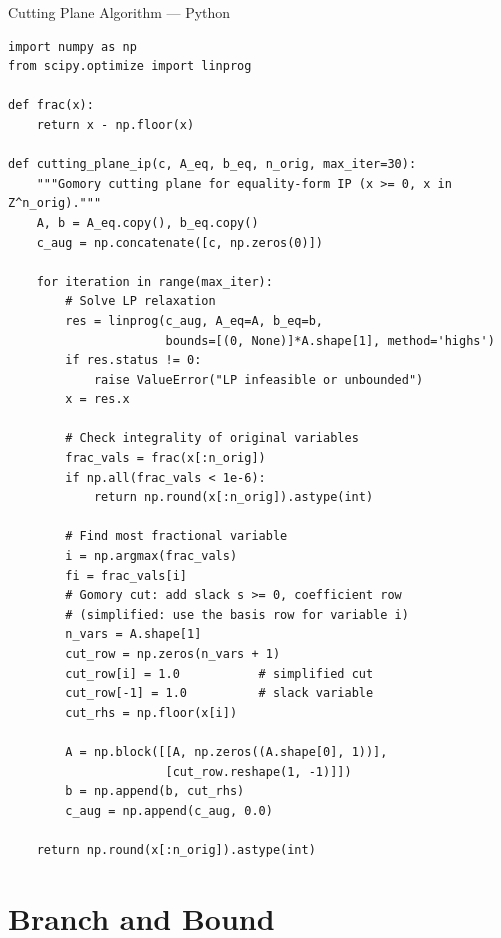 \documentclass[aspectratio=169,10pt]{beamer}
\begin{document}
\begin{frame}[fragile]{Cutting Plane Algorithm --- Python}
\begin{lstlisting}[style=pystyle, caption={Cutting plane method (Gomory) in Python}]
import numpy as np
from scipy.optimize import linprog

def frac(x):
    return x - np.floor(x)

def cutting_plane_ip(c, A_eq, b_eq, n_orig, max_iter=30):
    """Gomory cutting plane for equality-form IP (x >= 0, x in Z^n_orig)."""
    A, b = A_eq.copy(), b_eq.copy()
    c_aug = np.concatenate([c, np.zeros(0)])

    for iteration in range(max_iter):
        # Solve LP relaxation
        res = linprog(c_aug, A_eq=A, b_eq=b,
                      bounds=[(0, None)]*A.shape[1], method='highs')
        if res.status != 0:
            raise ValueError("LP infeasible or unbounded")
        x = res.x

        # Check integrality of original variables
        frac_vals = frac(x[:n_orig])
        if np.all(frac_vals < 1e-6):
            return np.round(x[:n_orig]).astype(int)

        # Find most fractional variable
        i = np.argmax(frac_vals)
        fi = frac_vals[i]
        # Gomory cut: add slack s >= 0, coefficient row
        # (simplified: use the basis row for variable i)
        n_vars = A.shape[1]
        cut_row = np.zeros(n_vars + 1)
        cut_row[i] = 1.0           # simplified cut
        cut_row[-1] = 1.0          # slack variable
        cut_rhs = np.floor(x[i])

        A = np.block([[A, np.zeros((A.shape[0], 1))],
                      [cut_row.reshape(1, -1)]])
        b = np.append(b, cut_rhs)
        c_aug = np.append(c_aug, 0.0)

    return np.round(x[:n_orig]).astype(int)
\end{lstlisting}
\end{frame}

\section{Branch and Bound}
\end{document}

